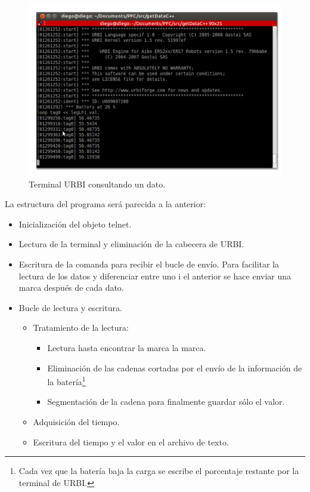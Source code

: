 \documentclass[12pt,a4paper,final,twoside]{book}
\begin{document}
\begin{figure}[h!]
	\centering
    \includegraphics[scale=0.65]{images/telnet.pdf}
	 \caption{Terminal URBI consultando un dato.}
  \label{fig:telnet}
\end{figure}

La estructura del programa será parecida a la anterior:

\begin{itemize}
\item Inicialización del objeto telnet.
\item Lectura de la terminal y eliminación de la cabecera de URBI.
\item Escritura de la comanda para recibir el bucle  de envío. Para facilitar la lectura de los datos y diferenciar entre uno i el anterior se hace enviar una marca después de cada dato.
\item Bucle de lectura y escritura.
\begin{itemize}
\item Tratamiento de la lectura:
\begin{itemize}
\item Lectura hasta encontrar la marca la marca.
\item Eliminación de las cadenas cortadas por el envío de la información de la batería\footnote{Cada vez que la batería baja la carga se escribe el porcentaje restante por la terminal de URBI.}
\item Segmentación de la cadena para finalmente guardar sólo el valor.
\end{itemize}
\item Adquisición del tiempo.
\item Escritura del tiempo y el valor en el archivo de texto.
\end{itemize} 
\end{itemize}
\end{document}
